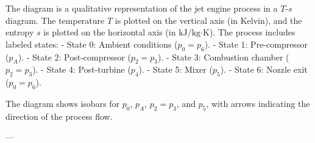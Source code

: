 The diagram is a qualitative representation of the jet engine process in a \( T \)-\( s \) diagram. The temperature \( T \) is plotted on the vertical axis (in Kelvin), and the entropy \( s \) is plotted on the horizontal axis (in \( \text{kJ}/\text{kg·K} \)). The process includes labeled states:  
- State 0: Ambient conditions (\( p_0 = p_6 \)).  
- State 1: Pre-compressor (\( p_A \)).  
- State 2: Post-compressor (\( p_2 = p_3 \)).  
- State 3: Combustion chamber (\( p_2 = p_3 \)).  
- State 4: Post-turbine (\( p_4 \)).  
- State 5: Mixer (\( p_5 \)).  
- State 6: Nozzle exit (\( p_0 = p_6 \)).  

The diagram shows isobars for \( p_0 \), \( p_A \), \( p_2 = p_3 \), and \( p_5 \), with arrows indicating the direction of the process flow.  

---